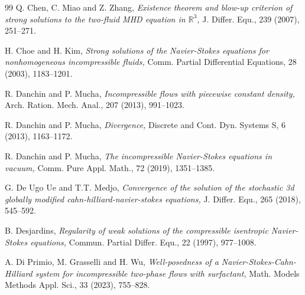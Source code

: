 \documentclass[11pt]{article}
\numberwithin{equation}{section}
\begin{document}
\begin{center}
\begin{thebibliography}{99}
 Q. Chen, C. Miao and Z. Zhang, {\it Existence theorem and blow-up criterion of strong solutions to the two-fluid MHD equation in $\mathbb{R}^{3}$,} J. Differ. Equ., 239 (2007), 251--271.


     H. Choe and H. Kim,  {\it  Strong solutions of the Navier-Stokes equations for nonhomogeneous incompressible fluids,} Comm. Partial Differential Equations, 28
(2003), 1183--1201.

R. Danchin and P. Mucha, {\it Incompressible flows with piecewise constant density,}  Arch. Ration. Mech. Anal., 207 (2013), 991--1023.

 R. Danchin and P. Mucha,  {\it Divergence,} Discrete and Cont. Dyn. Systems S,
6 (2013), 1163--1172.

R. Danchin and P. Mucha, {\it The incompressible Navier-Stokes equations in vacuum,} Comm. Pure
Appl. Math.,   72 (2019), 1351--1385.


G. De Ugo Ue and  T.T. Medjo, {\it Convergence of the solution of the stochastic 3d globally modified cahn-hilliard-navier-stokes equations,} J. Differ. Equ., 265 (2018), 545--592.



B. Desjardins, {\it Regularity of weak solutions of the compressible isentropic Navier-Stokes equations,}  Commun. Partial Differ. Equ.,  22 (1997), 977--1008.


A. Di Primio, M. Grasselli  and H. Wu, {\it Well-posedness of a Navier-Stokes-Cahn-Hilliard system for incompressible two-phase flows with surfactant,}  Math. Models Methods Appl. Sci., 33 (2023), 755--828.






\end{thebibliography}
\end{center}
\end{document}
